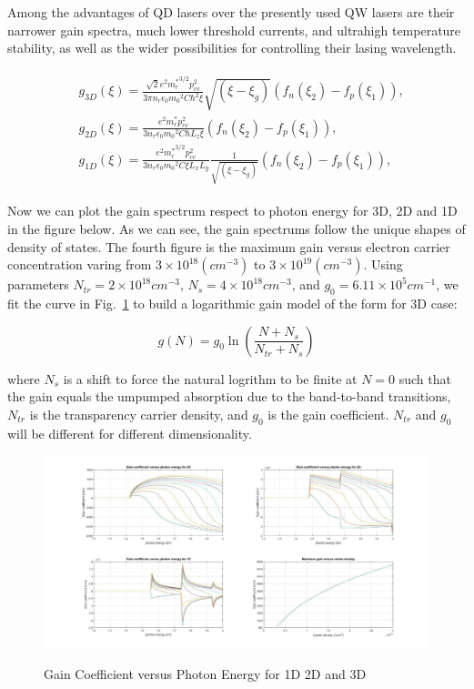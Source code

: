 Among the advantages of QD lasers over the presently used QW lasers are their
narrower gain spectra, much lower threshold currents, and ultrahigh temperature
stability, as well as the wider possibilities for controlling their lasing
wavelength.

\begin{eqnarray}
\begin{aligned}
  & g_{3D}(\xi)=\frac{\sqrt{2}e^2{m_r^\ast}^{3/2}{p_{cv}^2}}{3{\pi}n_r\epsilon_0{m_0}^2C{\hbar^2}\xi}{\sqrt{(\xi-\xi_g)}}(f_n(\xi_2)-f_p(\xi_1)),
\\
& g_{2D}(\xi)=\frac{e^2{m_r^\ast}{p_{cv}^2}}{3{n_r}\epsilon_0{m_0}^2C{\hbar}L_z\xi}(f_n(\xi_2)-f_p(\xi_1)),
\\
& g_{1D}(\xi)=\frac{e^2{m_r^\ast}^{3/2}{p_{cv}^2}}{3{n_r}\epsilon_0{m_0}^2C\xi{L_x}{L_y}}\frac{1}{\sqrt{(\xi-\xi_g)}}(f_n(\xi_2)-f_p(\xi_1)),
\end{aligned}
\label{eq:five}
\end{eqnarray}

Now we can plot the gain spectrum respect to photon energy for 3D, 2D and 1D in
the figure below. As we can see, the gain spectrums follow the unique shapes of
density of states. The fourth figure is the maximum gain versus electron
carrier concentration varing from $3\times10^{18} (cm^{-3})$ to
$3\times10^{19}(cm^{-3})$. Using parameters $N_{tr} = 2\times10^{18} cm^{-3}$,
$N_{s} = 4\times10^{18} cm^{-3}$, and $g_0 = 6.11\times10^{5} cm^{-1}$, we fit
the curve in Fig.~\ref{gainspectrum} to build a logarithmic gain model of the
form for 3D case:

\begin{equation}
  g(N) = g_0\ln\left(\frac{N+N_s}{N_{tr}+ N_s}\right)
\end{equation}

where $N_s$ is a shift to force the natural logrithm to be finite at $N = 0$
such that the gain equals the umpumped absorption due to the band-to-band
transitions, $N_{tr}$ is the transparency carrier density, and $g_0$ is the
gain coefficient. $N_{tr}$ and $g_0$ will be different for different
dimensionality.

\begin{figure}
  \caption{Gain Coefficient versus Photon Energy for 1D 2D and 3D}
  \centering
  \includegraphics[width=\textwidth]{pictures/LT/gainspectrum}
  \label{gainspectrum}
\end{figure}

